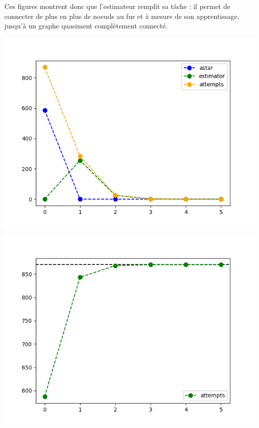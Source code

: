 \documentclass[a4paper,12pt]{report}
\begin{document}
Ces figures montrent donc que l'estimateur remplit sa tâche : il permet de connecter de plus en plus de noeuds au fur et à mesure de son apprentissage, jusqu'à un graphe quasiment complètement connecté.

\begin{minipage}[b]{0.45\textwidth}
	\begin{center}
	\includegraphics[width=1\linewidth]{images/connect_attempts_30nodes_6iterations.png}
		\label{fig:attempts}
	\end{center}
\end{minipage}
\hfill
\begin{minipage}[b]{0.45\textwidth}
	\begin{center}
		\includegraphics[width=1\linewidth]{images/connectivity_30nodes_6iterations.png}
		\label{fig:connectivity}
	\end{center}
\end{minipage}
\vspace{0.5cm}
\end{document}
